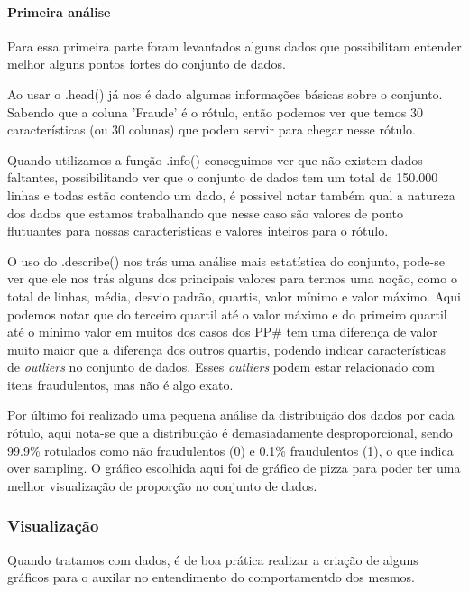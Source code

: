 \documentclass[11pt]{article}
\begin{document}
    \paragraph{Primeira análise}\label{primeira-anuxe1lise}

Para essa primeira parte foram levantados alguns dados que possibilitam
entender melhor alguns pontos fortes do conjunto de dados.

Ao usar o .head() já nos é dado algumas informações básicas sobre o
conjunto. Sabendo que a coluna 'Fraude' é o rótulo, então podemos ver
que temos 30 características (ou 30 colunas) que podem servir para
chegar nesse rótulo.

Quando utilizamos a função .info() conseguimos ver que não existem dados
faltantes, possibilitando ver que o conjunto de dados tem um total de
150.000 linhas e todas estão contendo um dado, é possivel notar também
qual a natureza dos dados que estamos trabalhando que nesse caso são
valores de ponto flutuantes para nossas características e valores
inteiros para o rótulo.

O uso do .describe() nos trás uma análise mais estatística do conjunto,
pode-se ver que ele nos trás alguns dos principais valores para termos
uma noção, como o total de linhas, média, desvio padrão, quartis, valor
mínimo e valor máximo. Aqui podemos notar que do terceiro quartil até o
valor máximo e do primeiro quartil até o mínimo valor em muitos dos
casos dos PP\# tem uma diferença de valor muito maior que a diferença
dos outros quartis, podendo indicar características de \emph{outliers}
no conjunto de dados. Esses \emph{outliers} podem estar relacionado com
itens fraudulentos, mas não é algo exato.

Por último foi realizado uma pequena análise da distribuição dos dados
por cada rótulo, aqui nota-se que a distribuição é demasiadamente
desproporcional, sendo 99.9\% rotulados como não fraudulentos (0) e
0.1\% fraudulentos (1), o que indica over sampling. O gráfico escolhida
aqui foi de gráfico de pizza para poder ter uma melhor visualização de
proporção no conjunto de dados.

\subsubsection{Visualização}\label{visualizauxe7uxe3o}

Quando tratamos com dados, é de boa prática realizar a criação de alguns
gráficos para o auxilar no entendimento do comportamentdo dos mesmos.
\end{document}
